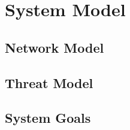 \section{System Model}

\subsection{Network Model}

\subsection{Threat Model}

\subsection{System Goals}

